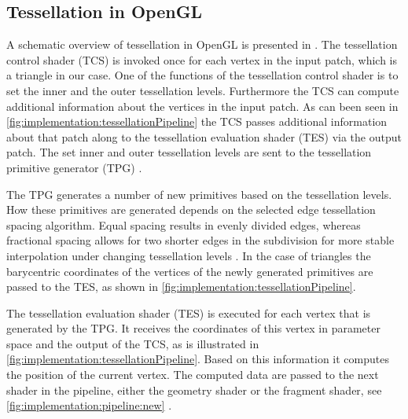 \subsection{Tessellation in OpenGL}
\label{ss:implementation:pipeline}

	A schematic overview of tessellation in OpenGL is presented in .
	The tessellation control shader (TCS) is invoked once for each vertex in the input patch, which is a triangle in our case. 
	One of the functions of the tessellation control shader is to set the inner and the outer tessellation levels. Furthermore the TCS can compute additional information about the vertices in the input patch. 
	As can been seen in \cref{fig:implementation:tessellationPipeline} the TCS passes additional information about that patch along to the tessellation evaluation shader (TES) via the output patch. The set inner and outer tessellation levels are sent to the tessellation primitive generator (TPG) \cite{wolff2013opengl}.

	The TPG generates a number of new primitives based on the tessellation levels. How these primitives are generated depends on the selected edge tessellation spacing algorithm. Equal spacing results in evenly divided edges, whereas fractional spacing allows for two shorter edges in the subdivision for more stable interpolation under changing tessellation levels \cite{wolff2013opengl,openGL41Core}. In the case of triangles the barycentric coordinates of the vertices of the newly generated primitives are passed to the TES, as shown in \cref{fig:implementation:tessellationPipeline}.

	The tessellation evaluation shader (TES) is executed for each vertex that is generated by the TPG. 
	It receives the coordinates of this vertex in parameter space and the output of the TCS, as is illustrated in \cref{fig:implementation:tessellationPipeline}. 
	Based on this information it computes the position of the current vertex. 
	The computed data are passed to the next shader in the pipeline, either the geometry shader or the fragment shader, see \cref{fig:implementation:pipeline:new} \cite{wolff2013opengl}.

